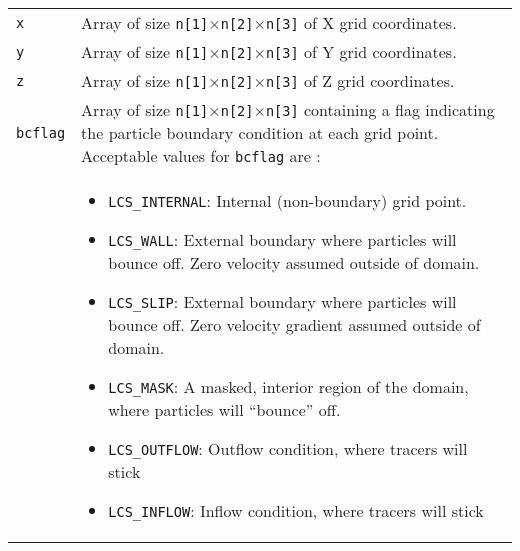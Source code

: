 \documentclass[letterpaper,11pt]{article}
\begin{document}
\begin{longtable}{p{}p{}}
\verb|x|& Array of size \verb|n[1]|$\times$\verb|n[2]|$\times$\verb|n[3]| of X grid coordinates.\\
\verb|y|& Array of size \verb|n[1]|$\times$\verb|n[2]|$\times$\verb|n[3]| of Y grid coordinates.\\
\verb|z|& Array of size \verb|n[1]|$\times$\verb|n[2]|$\times$\verb|n[3]| of Z grid coordinates.\\
\verb|bcflag|& Array of size \verb|n[1]|$\times$\verb|n[2]|$\times$\verb|n[3]| containing a flag indicating the particle boundary condition at each grid point.  Acceptable values for \verb|bcflag| are :\\
&\begin{itemize}
  \item \verb|LCS_INTERNAL|:  Internal (non-boundary) grid point.
  \item \verb|LCS_WALL|:  External boundary where particles will bounce off.  Zero velocity assumed outside of domain.
  \item \verb|LCS_SLIP|: External boundary where particles will bounce off. Zero velocity gradient assumed outside of domain.
  \item \verb|LCS_MASK|: A masked, interior region of the domain, where particles will ``bounce'' off.  
  \item \verb|LCS_OUTFLOW|: Outflow condition, where tracers will stick
  \item \verb|LCS_INFLOW|: Inflow condition, where tracers will stick
 \end{itemize}\\
 \hline
\end{longtable}
\end{document}
